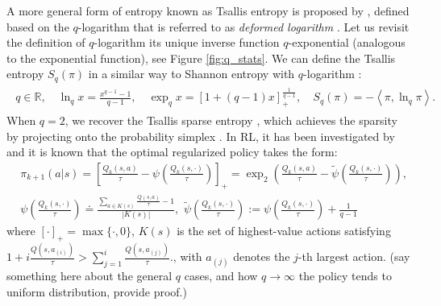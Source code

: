 \documentclass{article}
\newcommand{\AdaBracket}[1]{\left(#1\right)}
\newcommand{\AdaRectBracket}[1]{\left[#1\right]}
\newcommand{\AdaAngleProduct}[2]{\left\langle#1, #2\right\rangle}
\newcommand{\qlog}{$q$-logarithm }
\newcommand{\tsallis}[1]{S_q(#1)}
\newcommand{\logq}[1]{\ln_{q}\!#1}
\newcommand{\expq}[1]{\exp_{q}\!#1}
\begin{document}
A more general form of entropy known as Tsallis entropy is proposed by \cite{TsallisEntropy},  defined based on the \qlog that is referred to as \emph{deformed logarithm} \cite{tsallis2009introduction}.
Let us revisit the definition of \qlog its unique inverse function $q$-exponential (analogous to the exponential function), see Figure \ref{fig:q_stats}.
We can define the Tsallis entropy $S_q(\pi)$ in a similar way to Shannon entropy with \qlog:
\begin{align}
    \begin{split}
        q \in  \mathbb{R}, \quad \logq{x} = \frac{x^{q-1} - 1}{q-1}, \quad \expq{x} = \AdaRectBracket{1 + (q - 1)x}^{\frac{1}{q-1}}_{+},\quad \tsallis{\pi} = -\AdaAngleProduct{\pi}{\logq{\pi}}.
    \end{split}
\end{align}
When $q=2$, we recover the Tsallis sparse entropy \cite{Martins16-sparsemax}, which achieves the sparsity by projecting onto the probability simplex \cite{Blondel-2020LearningFenchelYoundLoss}.
In RL, it has been investigated by \cite{Lee2018-TsallisRAL,Lee2020-generalTsallisRSS} and it is known that the optimal regularized policy takes the form:
\begin{align*}
    &\pi_{k+1}(a|s) = \AdaRectBracket{\frac{Q_k(s,a)}{\tau} - \psi\AdaBracket{\frac{Q_k(s, \cdot)}{\tau}}}_{+} = \exp_2 \AdaBracket{\frac{Q_k(s,a)}{\tau } - \tilde{\psi}\AdaBracket{\frac{Q_k(s, \cdot)}{\tau }}}, \\
    &{\psi}\AdaBracket{\frac{Q_{k}(s,\cdot)}{\tau}} \doteq \frac{\sum_{a\in K(s)} \frac{Q(s,a)}{\tau} - 1 }{|K{(s)}|}, \,\, \tilde{\psi}\AdaBracket{\frac{Q_{k}(s,\cdot)}{\tau}} := \psi\AdaBracket{\frac{Q_{k}(s,\cdot)}{\tau}} + \frac{1}{q-1}
\end{align*}
where $[\cdot]_{+} = \max \{\cdot, 0\}$,  $K(s)$ is the set of highest-value actions satisfying $1 \!+\! i\frac{Q(s,a_{(i)})}{\tau} \!>\! \sum_{j=1}^{i}\frac{Q(s,a_{(j)})}{\tau}$., with $a_{(j)}$ denotes the $j$-th largest action.
{\color{red}(say something here about the general $q$ cases, and how $q \rightarrow \infty$ the policy tends to uniform distribution, provide proof.)}

\end{document}
